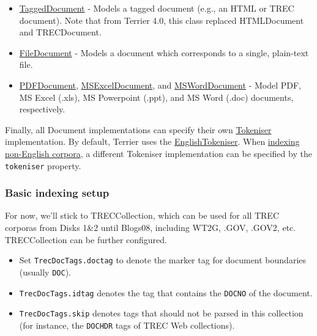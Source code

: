 \begin{itemize}
\tightlist
\item
  \href{javadoc/org/terrier/indexing/TaggedDocument.html}{TaggedDocument}
  - Models a tagged document (e.g., an HTML or TREC document). Note that
  from Terrier 4.0, this class replaced HTMLDocument and TRECDocument.
\item
  \href{javadoc/org/terrier/indexing/FileDocument.html}{FileDocument} -
  Models a document which corresponds to a single, plain-text file.
\item
  \href{javadoc/org/terrier/indexing/PDFDocument.html}{PDFDocument},
  \href{javadoc/org/terrier/indexing/MSExcelDocument.html}{MSExcelDocument},
  and
  \href{javadoc/org/terrier/indexing/MSWordDocument.html}{MSWordDocument}
  - Model PDF, MS Excel (.xls), MS Powerpoint (.ppt), and MS Word (.doc)
  documents, respectively.
\end{itemize}

Finally, all Document implementations can specify their own
\href{javadoc/org/terrier/indexing/tokenisation/Tokeniser.html}{Tokeniser}
implementation. By default, Terrier uses the
\href{javadoc/org/terrier/indexing/tokenisation/EnglishTokeniser.html}{EnglishTokeniser}.
When \href{languages.html}{indexing non-English corpora}, a different
Tokeniser implementation can be specified by the \texttt{tokeniser}
property.

\subsubsection{Basic indexing setup}\label{basic-indexing-setup}

For now, we'll stick to TRECCollection, which can be used for all TREC
corporas from Disks 1\&2 until Blogs08, including WT2G, .GOV, .GOV2,
etc. TRECCollection can be further configured.

\begin{itemize}
\tightlist
\item
  Set \texttt{TrecDocTags.doctag} to denote the marker tag for document
  boundaries (usually \texttt{DOC}).
\item
  \texttt{TrecDocTags.idtag} denotes the tag that contains the
  \texttt{DOCNO} of the document.
\item
  \texttt{TrecDocTags.skip} denotes tags that should not be parsed in
  this collection (for instance, the \texttt{DOCHDR} tags of TREC Web
  collections).
\end{itemize}

